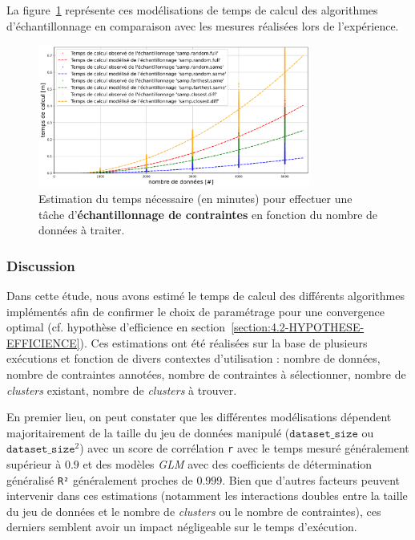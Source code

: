 			La figure~\ref{figure:4.3.2-ETUDE-COUTS-TEMPS-CALCUL-MODELISATION-SAMPLING} représente ces modélisations de temps de calcul des algorithmes d'échantillonnage en comparaison avec les mesures réalisées lors de l'expérience.
			\newline
			\begin{figure}[!htb]
				\centering
				\includegraphics[width=0.8\textwidth]{figures/etude-temps-calcul-modelisation-4samp}
				\caption{Estimation du temps nécessaire (en minutes) pour effectuer une tâche d'\textbf{échantillonnage de contraintes} en fonction du nombre de données à traiter.}
				\label{figure:4.3.2-ETUDE-COUTS-TEMPS-CALCUL-MODELISATION-SAMPLING}
			\end{figure}

		\subsubsection{Discussion}
		
			Dans cette étude, nous avons estimé le temps de calcul des différents algorithmes implémentés afin de confirmer le choix de paramétrage pour une convergence optimal (cf. hypothèse d'efficience en section~\ref{section:4.2-HYPOTHESE-EFFICIENCE}).
			Ces estimations ont été réalisées sur la base de plusieurs exécutions et fonction de divers contextes d'utilisation : nombre de données, nombre de contraintes annotées, nombre de contraintes à sélectionner, nombre de \textit{clusters} existant, nombre de \textit{clusters} à trouver.
			
			En premier lieu, on peut constater que les différentes modélisations dépendent majoritairement de la taille du jeu de données manipulé ($\texttt{dataset\_size}$ ou $\texttt{dataset\_size}^{2}$) avec un score de corrélation \texttt{r} avec le temps mesuré généralement supérieur à $0.9$ et des modèles \textit{GLM} avec des coefficients de détermination généralisé \texttt{R²} généralement proches de $0.999$.
			Bien que d'autres facteurs peuvent intervenir dans ces estimations (notamment les interactions doubles entre la taille du jeu de données et le nombre de \textit{clusters} ou le nombre de contraintes), ces derniers semblent avoir un impact négligeable sur le temps d'exécution.
			
